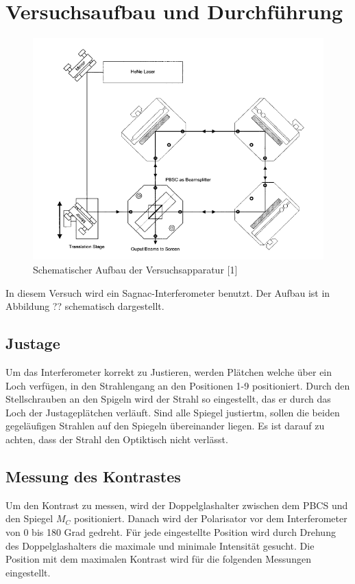 \section{Versuchsaufbau und Durchführung}

\begin{figure}[h]
\centering
\includegraphics[scale=0.8]{img/aufbau.PNG}
\caption{Schematischer Aufbau der Versuchsapparatur [1]}
\label{aufbau}
\end{figure}


In diesem Versuch wird ein Sagnac-Interferometer benutzt. Der Aufbau ist in Abbildung ?? schematisch dargestellt.

\subsection{Justage}
Um das Interferometer korrekt zu Justieren, werden Plätchen welche über ein Loch verfügen, in den Strahlengang an den Positionen 1-9 positioniert. Durch den Stellschrauben an den Spigeln wird der Strahl
so eingestellt, das er durch das Loch der Justageplätchen verläuft. Sind alle Spiegel justiertm, sollen die beiden gegeläufigen Strahlen auf den Spiegeln übereinander liegen.
Es ist darauf zu achten, dass der Strahl den Optiktisch nicht verlässt.


\subsection{Messung des Kontrastes}
Um den Kontrast zu messen, wird der Doppelglashalter zwischen dem PBCS und den Spiegel $M_C$ positioniert. Danach wird der Polarisator vor dem Interferometer
von 0 bis 180 Grad gedreht. Für jede eingestellte Position wird durch Drehung des Doppelglashalters die maximale und minimale Intensität gesucht.
Die Position mit dem maximalen Kontrast wird für die folgenden Messungen eingestellt.

